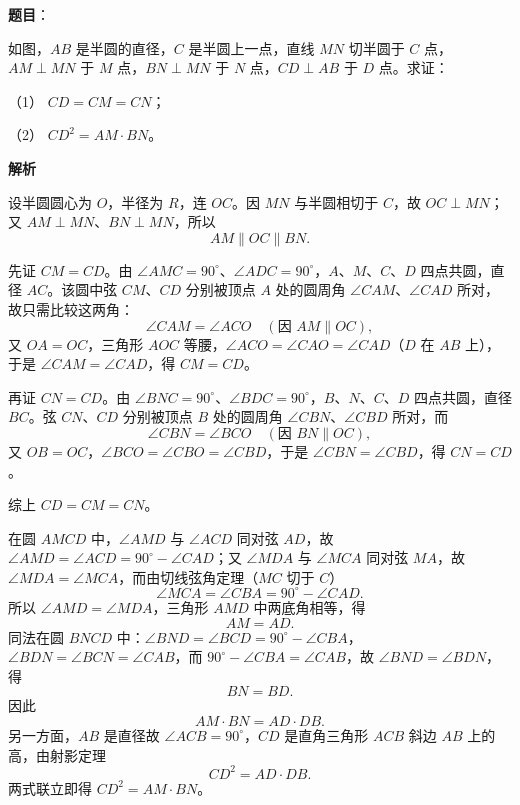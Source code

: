 \begin{answer}

\textbf{题目}：

如图，$AB$ 是半圆的直径，$C$ 是半圆上一点，直线 $MN$ 切半圆于 $C$ 点，$AM\perp MN$ 于 $M$ 点，$BN\perp MN$ 于 $N$ 点，$CD\perp AB$ 于 $D$ 点。求证：

（1） $CD=CM=CN$；

（2） $CD^2=AM\cdot BN$。
\nopagebreak[4]
\begin{center}\end{center}
\nopagebreak[4]
\textbf{解析}
\nopagebreak[4]
\begin{center}\end{center}
\nopagebreak[4]
设半圆圆心为 $O$，半径为 $R$，连 $OC$。因 $MN$ 与半圆相切于 $C$，故 $OC\perp MN$；又 $AM\perp MN$、$BN\perp MN$，所以
\nopagebreak[4]
\[
AM\parallel OC\parallel BN.
\]


先证 $CM=CD$。由 $\angle AMC=90^\circ$、$\angle ADC=90^\circ$，$A$、$M$、$C$、$D$ 四点共圆，直径 $AC$。该圆中弦 $CM$、$CD$ 分别被顶点 $A$ 处的圆周角 $\angle CAM$、$\angle CAD$ 所对，故只需比较这两角：
\nopagebreak[4]
\[
\angle CAM=\angle ACO\quad(\text{因 }AM\parallel OC),
\]
又 $OA=OC$，三角形 $AOC$ 等腰，$\angle ACO=\angle CAO=\angle CAD$（$D$ 在 $AB$ 上），于是 $\angle CAM=\angle CAD$，得 $CM=CD$。

再证 $CN=CD$。由 $\angle BNC=90^\circ$、$\angle BDC=90^\circ$，$B$、$N$、$C$、$D$ 四点共圆，直径 $BC$。弦 $CN$、$CD$ 分别被顶点 $B$ 处的圆周角 $\angle CBN$、$\angle CBD$ 所对，而
\nopagebreak[4]
\[
\angle CBN=\angle BCO\quad(\text{因 }BN\parallel OC),
\]
又 $OB=OC$，$\angle BCO=\angle CBO=\angle CBD$，于是 $\angle CBN=\angle CBD$，得 $CN=CD$。

综上 $CD=CM=CN$。


在圆 $AMCD$ 中，$\angle AMD$ 与 $\angle ACD$ 同对弦 $AD$，故 $\angle AMD=\angle ACD=90^\circ-\angle CAD$；又 $\angle MDA$ 与 $\angle MCA$ 同对弦 $MA$，故 $\angle MDA=\angle MCA$，而由切线弦角定理（$MC$ 切于 $C$）
\nopagebreak[4]
\[
\angle MCA=\angle CBA=90^\circ-\angle CAD.
\]
所以 $\angle AMD=\angle MDA$，三角形 $AMD$ 中两底角相等，得
\nopagebreak[4]
\[
AM=AD.
\]
同法在圆 $BNCD$ 中：$\angle BND=\angle BCD=90^\circ-\angle CBA$，$\angle BDN=\angle BCN=\angle CAB$，而 $90^\circ-\angle CBA=\angle CAB$，故 $\angle BND=\angle BDN$，得
\nopagebreak[4]
\[
BN=BD.
\]
因此
\nopagebreak[4]
\[
AM\cdot BN=AD\cdot DB.
\]
另一方面，$AB$ 是直径故 $\angle ACB=90^\circ$，$CD$ 是直角三角形 $ACB$ 斜边 $AB$ 上的高，由射影定理
\nopagebreak[4]
\[
CD^2=AD\cdot DB.
\]
两式联立即得 $CD^2=AM\cdot BN$。



\end{answer}
